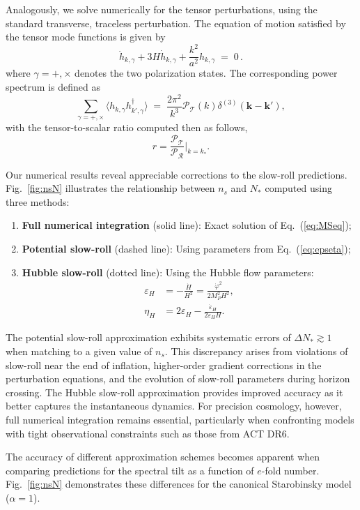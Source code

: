 \documentclass[aps,prev,twocolumn,preprintnumbers,floatfix,nofootinbib]{revtex4-1}
\newcommand{\beq}{\begin{equation}}
\newcommand{\eeq}{\end{equation}}
\begin{document}
Analogously, we solve numerically for the tensor perturbations, using the standard transverse, traceless perturbation. The equation of motion satisfied by the tensor mode functions is given by
\beq\label{eq:heq}
\ddot{h}_{k,\gamma} + 3H\dot{h}_{k,\gamma} + \frac{k^2}{a^2} h_{k,\gamma} \;=\; 0\,.
\eeq
where $\gamma=+,\times$ denotes the two polarization states. The corresponding power spectrum is defined as
\beq
\sum_{\gamma=+,\times} \langle h_{k,\gamma}h^{\dagger}_{k',\gamma}\rangle \;=\; \frac{2\pi^2}{k^3}\mathcal{P}_{\mathcal{T}}(k)\delta^{(3)}(\mathbf{k} - \mathbf{k'}),
\eeq
with the tensor-to-scalar ratio computed then as follows,
\beq
\label{eq:rdef}
r = \frac{\mathcal{P}_{\mathcal{T}}}{\mathcal{P}_{\mathcal{R}}}\bigg|_{k=k_*}.
\eeq

Our numerical results reveal appreciable corrections to the slow-roll predictions. Fig.~\ref{fig:nsN} illustrates the relationship between $n_s$ and $N_*$ computed using three methods:

\begin{enumerate}
\item \textbf{Full numerical integration} (solid line): Exact solution of Eq.~(\ref{eq:MSeq});
\item \textbf{Potential slow-roll} (dashed line): Using parameters from Eq.~(\ref{eq:epseta});
\item \textbf{Hubble slow-roll} (dotted line): Using the Hubble flow parameters:
\begin{align}
\label{eq:epsetaH}
\varepsilon_H &= -\frac{\dot{H}}{H^2} = \frac{\dot{\varphi}^2}{2M_P^2 H^2}, \\
\eta_H &= 2\varepsilon_H - \frac{\dot{\varepsilon}_H}{2\varepsilon_H H}.
\end{align}
\end{enumerate}

The potential slow-roll approximation exhibits systematic errors of $\Delta N_* \gtrsim 1$ when matching to a given value of $n_s$. This discrepancy arises from violations of slow-roll near the end of inflation, higher-order gradient corrections in the perturbation equations, and the evolution of slow-roll parameters during horizon crossing. The Hubble slow-roll approximation provides improved accuracy as it better captures the instantaneous dynamics. For precision cosmology, however, full numerical integration remains essential, particularly when confronting models with tight observational constraints such as those from ACT DR6.


The accuracy of different approximation schemes becomes apparent when comparing predictions for the spectral tilt as a function of $e$-fold number. Fig.~\ref{fig:nsN} demonstrates these differences for the canonical Starobinsky model ($\alpha = 1$).
\end{document}
